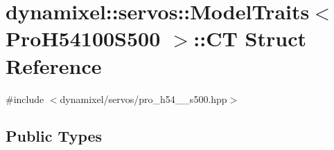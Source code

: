 \hypertarget{structdynamixel_1_1servos_1_1_model_traits_3_01_pro_h54100_s500_01_4_1_1_c_t}{}\section{dynamixel\+:\+:servos\+:\+:Model\+Traits$<$ Pro\+H54100\+S500 $>$\+:\+:CT Struct Reference}
\label{structdynamixel_1_1servos_1_1_model_traits_3_01_pro_h54100_s500_01_4_1_1_c_t}


{\ttfamily \#include $<$dynamixel/servos/pro\+\_\+h54\+\_\+\_\+s500.\+hpp$>$}

\subsection*{Public Types}
